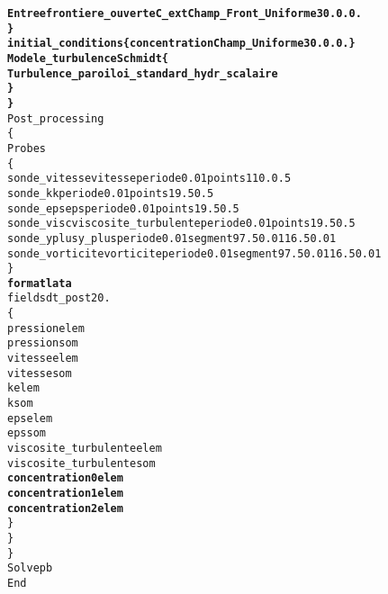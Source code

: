 \begin{alltt}
             {\bf{Entree         frontiere_ouverte C_ext Champ_Front_Uniforme 3 0. 0. 0. }}
        {\bf{\} }}
        {\bf{initial_conditions \{ concentration Champ_Uniforme 3 0. 0. 0. \} }}
        {\bf{Modele_turbulence Schmidt \{ }}
            {\bf{Turbulence_paroi loi_standard_hydr_scalaire }}
        {\bf{\} }}
    {\bf{\} }}
    Post_processing
    \{
        Probes 
        \{
            sonde_vitesse vitesse periode 0.01 points 1 10. 0.5
            sonde_k k periode 0.01 points 1 9.5 0.5
            sonde_eps eps periode 0.01 points 1 9.5 0.5
            sonde_visc viscosite_turbulente periode 0.01 points 1 9.5 0.5
            sonde_yplus y_plus periode 0.01 segment 9 7.5 0.01 16.5 0.01
            sonde_vorticite vorticite periode 0.01 segment 9 7.5 0.01 16.5 0.01
        \}
        {\bf{format lata}}
        fields dt_post 20.
        \{
            pression elem
            pression som
            vitesse elem
            vitesse som
            k elem
            k som
            eps elem
            eps som
            viscosite_turbulente elem
            viscosite_turbulente som
            {\bf{concentration0 elem}}
            {\bf{concentration1 elem}}
            {\bf{concentration2 elem}}
        \}
    \}
\}
Solve pb
End
\end{alltt}
